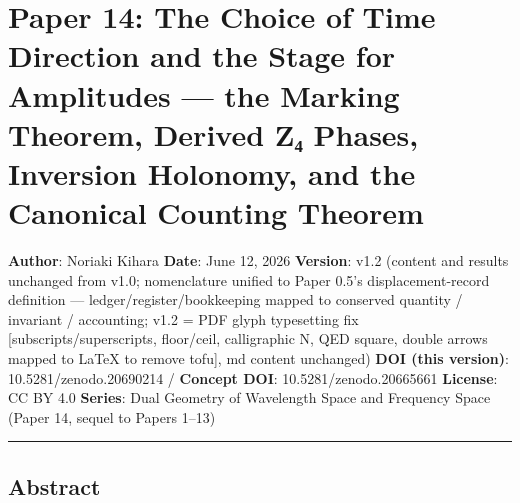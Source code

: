 \documentclass[
]{ltjsarticle}
\author{}
\date{}
\begin{document}
\section{Paper 14: The Choice of Time Direction and the Stage for
Amplitudes --- the Marking Theorem, Derived Z₄ Phases, Inversion
Holonomy, and the Canonical Counting
Theorem}\label{paper-14-the-choice-of-time-direction-and-the-stage-for-amplitudes-the-marking-theorem-derived-zux2084-phases-inversion-holonomy-and-the-canonical-counting-theorem}

\textbf{Author}: Noriaki Kihara \textbf{Date}: June 12, 2026
\textbf{Version}: v1.2 (content and results unchanged from v1.0;
nomenclature unified to Paper 0.5's displacement-record definition ---
ledger/register/bookkeeping mapped to conserved quantity / invariant /
accounting; v1.2 = PDF glyph typesetting fix {[}subscripts/superscripts,
floor/ceil, calligraphic N, QED square, double arrows mapped to LaTeX to
remove tofu{]}, md content unchanged) \textbf{DOI (this version)}:
10.5281/zenodo.20690214 / \textbf{Concept DOI}: 10.5281/zenodo.20665661
\textbf{License}: CC BY 4.0 \textbf{Series}: Dual Geometry of Wavelength
Space and Frequency Space (Paper 14, sequel to Papers 1--13)

\begin{center}\rule{0.5\linewidth}{0.5pt}\end{center}

\subsection{Abstract}\label{abstract}
\end{document}
